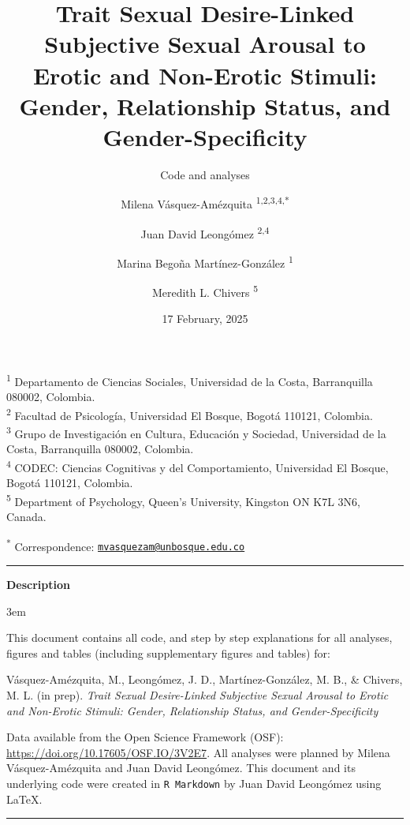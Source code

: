 \documentclass[
  bookmarksnumbered]{article}
\title{Trait Sexual Desire-Linked Subjective Sexual Arousal to Erotic and Non-Erotic Stimuli: Gender, Relationship Status, and Gender-Specificity}
\subtitle{Code and analyses}
\author{Milena Vásquez-Amézquita \orcidlink{0000-0001-7317-8430}\textsuperscript{1,2,3,4,*} \and Juan David Leongómez \orcidlink{0000-0002-0092-6298}\textsuperscript{2,4} \and Marina Begoña Martínez-González \orcidlink{0000-0002-5840-6383}\textsuperscript{1} \and Meredith L. Chivers \orcidlink{0000-0002-5495-9263}\textsuperscript{5}}
\date{17 February, 2025}
\begin{document}
\maketitle

\textsuperscript{1} Departamento de Ciencias Sociales, Universidad de la Costa, Barranquilla 080002, Colombia.\\
\textsuperscript{2} Facultad de Psicología, Universidad El Bosque, Bogotá 110121, Colombia.\\
\textsuperscript{3} Grupo de Investigación en Cultura, Educación y Sociedad, Universidad de la Costa, Barranquilla 080002, Colombia.\\
\textsuperscript{4} CODEC: Ciencias Cognitivas y del Comportamiento, Universidad El Bosque, Bogotá 110121, Colombia.\\
\textsuperscript{5} Department of Psychology, Queen's University, Kingston ON K7L 3N6, Canada.

\textsuperscript{*} Correspondence: \href{mailto:mvasquezam@unbosque.edu.co}{\href{mailto:mvasquezam@unbosque.edu.co}{\nolinkurl{mvasquezam@unbosque.edu.co}}}

\begin{center}\rule{0.5\linewidth}{0.5pt}\end{center}

\begin{center}
\textbf{Description}
\end{center}

\par
\begingroup
\leftskip3em
\rightskip\leftskip

This document contains all code, and step by step explanations for all analyses, figures and tables (including supplementary figures and tables) for:

\begin{hangparas}{.25in}{1}
Vásquez-Amézquita, M., Leongómez, J. D., Martínez-González, M. B., \& Chivers, M. L. (in prep). \textit{Trait Sexual Desire-Linked Subjective Sexual Arousal to Erotic and Non-Erotic Stimuli: Gender, Relationship Status, and Gender-Specificity}
\end{hangparas}

Data available from the Open Science Framework (OSF): \url{https://doi.org/10.17605/OSF.IO/3V2E7}. All analyses were planned by Milena Vásquez-Amézquita and Juan David Leongómez. This document and its underlying code were created in \texttt{R\ Markdown} by Juan David Leongómez using \LaTeX.

\begin{center}\rule{0.5\linewidth}{0.5pt}\end{center}
\end{document}
